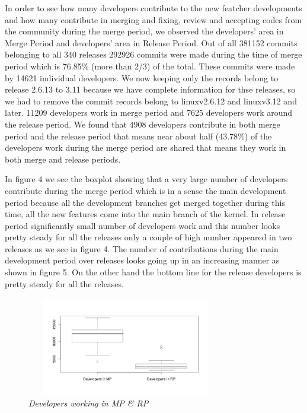 \documentclass{acm_proc_article-sp}
\begin{document}
In order to see how many developers contribute to the new featcher developments and how many contribute in merging and fixing, review and accepting codes from the community during the merge period, we observed the developers' area in Merge Period and developers' area in Release Period. Out of all 381152 commits belonging to all 340 releases 292926 commits were made during the time of merge period which is 76.85\% (more than 2/3) of the total. These commits were made by 14621 individual developers. We now keeping only the records belong to release 2.6.13 to 3.11 because we have complete information for thse releases, so we had to remove the commit records belong to linuxv2.6.12 and linuxv3.12 and later. 11209 developers work in merge period and 7625 developers work around the release period. We found that 4908 developers contribute in both merge period and the release period that means near about half (43.78\%) of the developers work during the merge period are shared that means they work in both merge and release periods.

In figure 4 we see the boxplot showing that a very large number of developers contribute during the merge period which is in a sense the main development period because all the development branches get merged together during this time, all the new features come into the main branch of the kernel. In release period significantly small number of developers work and this number looks pretty steady for all the releases only a couple of high number appeared in two releases as we see in figure 4. The number of contributions during the main development period over releases looks going up in an increasing manner as shown in figure 5. On the other hand the bottom line for the release developers is pretty steady for all the releases.

\begin{figure}
\begin{center}
\includegraphics[height=1.7in,width=3.4in]{devsMPRPbox.png}
\caption{\small \sl Developers working in MP \& RP}
\end{center}
\end{figure}
\end{document}

